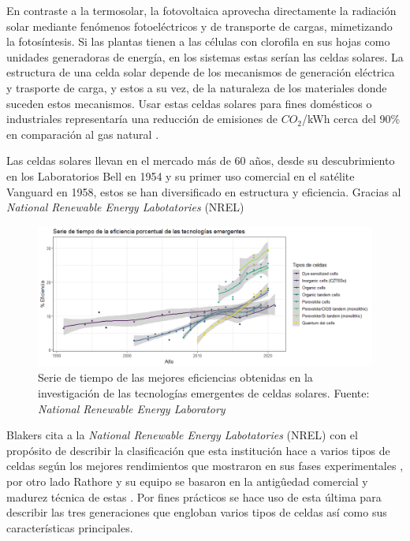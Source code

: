 En contraste a la termosolar, la fotovoltaica aprovecha directamente la radiación solar mediante fenómenos fotoeléctricos y de transporte de cargas, mimetizando la fotosíntesis. Si las plantas tienen a las células con clorofila en sus hojas como unidades generadoras de energía, en los sistemas estas serían las celdas solares. La estructura de una celda solar depende de los mecanismos de generación eléctrica y trasporte de carga, y estos a su vez, de la naturaleza de los materiales donde suceden estos mecanismos. Usar estas celdas solares para fines domésticos o industriales representaría una reducción de emisiones de $CO_2$/kWh cerca del 90\% en comparación al gas natural \cite{tawalbeh2021environmental}.


Las celdas solares llevan en el mercado más de 60 años, desde su descubrimiento en los  Laboratorios Bell en 1954 \cite{green2009path} y su primer uso comercial en el satélite Vanguard \cite{singh2013solar} en 1958, estos se han diversificado en estructura y eficiencia. Gracias al  \textit{National Renewable Energy Labotatories} (NREL)


\begin{figure}[h!]
    \includegraphics[scale=0.6]{img/SeriesEmergentes.png}
    \caption{Serie de tiempo de las mejores eficiencias obtenidas en la investigación de las tecnologías emergentes de celdas solares.
    Fuente: \textit{National Renewable Energy Laboratory} \cite{owidenergy}}
\end{figure}



Blakers cita a la 
\textit{National Renewable Energy Labotatories} (NREL) con el propósito de describir la clasificación que esta institución hace a varios tipos de celdas  según los mejores rendimientos que mostraron en sus fases experimentales \cite{blakers2013}, por otro lado Rathore y su equipo se basaron en la antigûedad comercial y madurez técnica de estas \cite{rathore2021}. Por fines prácticos se hace uso de esta última para describir las tres generaciones que engloban varios tipos de celdas así como sus características principales. 

